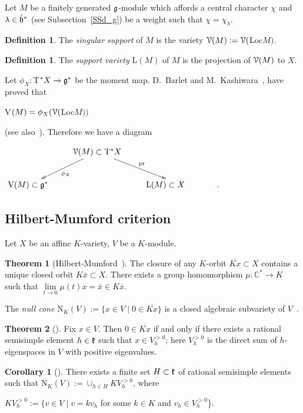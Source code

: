 \documentclass[12pt]{amsart}
\theoremstyle{definition}\newtheorem{theorem}{Theorem}[section]
\newtheorem{corollary}[proposition]{Corollary}
\theoremstyle{definition}\newtheorem{definition}[proposition]{Definition}
\theoremstyle{remark}\newtheorem{example}[proposition]{Example}
\renewcommand{\to}[1][]{\xrightarrow{#1}}
\begin{document}
Let $M$ be a finitely generated $\frak g$-module which affords a central character $\chi$ and $\lambda\in\hat{\frak h}^*$ (see Subsection~\ref{SSd_g}) be a weight such that $\chi=\chi_\lambda$.
\begin{definition} The {\it singular support} of  $M$ is the variety $\EuScript V(M):=\EuScript V($Loc$M)$.\end{definition}
\begin{definition} The {\it support variety} L$(M)$ of $M$ is the projection of $\EuScript V(M)$ to $X$.\end{definition}
Let $\phi_X:$T$^*X\to\frak g^*$ be the moment map. D.~Barlet and M.~Kashiwara~\cite{BK}, have proved that \begin{center}V$(M)=\phi_X(\EuScript V($Loc$M))$\end{center} (see also~\cite{BoBry}). Therefore we have a diagram
\begin{center}\hspace{40pt}$\xymatrix{&\EuScript V(M)\subset\mathrm T^*X\ar[ld]^{\phi_X} \ar[rd]^{\mathrm{pr}} &\\\mathrm{V(}M\mathrm{)}\subset\frak g^*&&\mathrm L(M)\subset X\hspace{39pt}.}$\end{center}
\subsection{Hilbert-Mumford criterion}\label{SSHM} Let $X$ be an affine $K$-variety, $V$ be a $K$-module.
\begin{theorem}[Hilbert-Mumford~\cite{VP}] The closure of any $K$-orbit $\overline{Kx}\subset X$ contains a unique closed orbit $K\overline x\subset X$. There exists a group homomorphism $\mu:\mathbb C^*\to K$ such that $\lim\limits_{t\to 0}\mu(t)x=\bar x\in K\overline x$.\end{theorem}
The {\it null cone} N$_K(V):=\{x\in V\mid 0\in \overline{Kx}\}$ is a closed algebraic subvariety of $V$~\cite{VP}.
\begin{theorem}[\cite{VP}]Fix $x\in V$. Then $0\in \overline{Kx}$ if and only if there exists a rational semisimple element $h\in\frak k$ such that $x\in V^{>0}_h$; here $V^{> 0}_h$ is the direct sum of $h$-eigenspaces in $V$ with positive eigenvalues.\end{theorem}
\begin{corollary}[\cite{VP}]\label{CHM} There exists a finite set $H\subset\frak k$ of rational semisimple elements such that N$_K(V):=\cup_{h\in H}KV_h^{>0}$, where \begin{center}$KV_h^{>0}:=\{v\in V\mid v=kv_h$ for some $k\in K$ and $v_h\in V_h^{>0}$\}.\end{center}\end{corollary}
\end{document}
